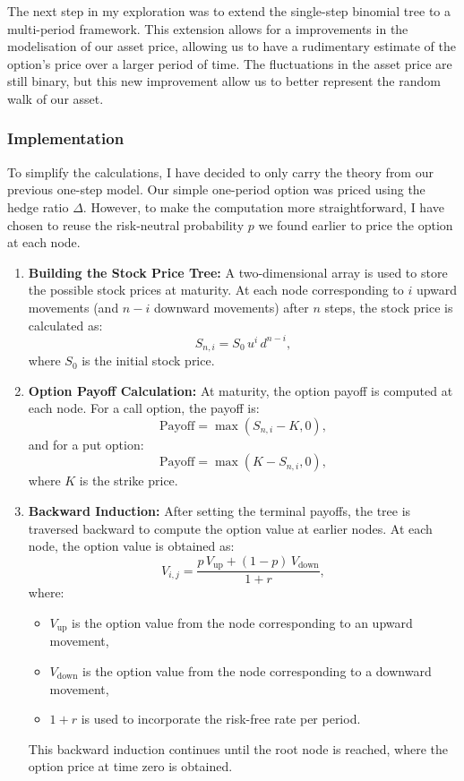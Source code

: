 \documentclass{article}
\begin{document}
    The next step in my exploration was to extend the single-step binomial tree to a multi-period framework.
    This extension allows for a improvements in the modelisation of our asset price, allowing us to have a rudimentary estimate of the option's price over a larger period of time.
    The fluctuations in the asset price are still binary, but this new improvement allow us to better represent the random walk of our asset.

    \subsubsection{Implementation}

    To simplify the calculations, I have decided to only carry the theory from our previous one-step model.
    Our simple one-period option was priced using the hedge ratio \(\Delta\).
    However, to make the computation more straightforward, I have chosen to reuse the risk-neutral probability \(p\) we found earlier to price the option at each node.

    \begin{enumerate}

        \item \textbf{Building the Stock Price Tree:} A two-dimensional array is used to store the possible stock prices at maturity. At each node corresponding to \( i \) upward movements (and \( n-i \) downward movements) after \( n \) steps, the stock price is calculated as:
        \[
        S_{n,i} = S_0 \, u^i \, d^{n-i},
        \]
        where \( S_0 \) is the initial stock price.

        \item \textbf{Option Payoff Calculation:} At maturity, the option payoff is computed at each node. For a call option, the payoff is:
        \[
        \text{Payoff} = \max(S_{n,i} - K, 0),
        \]
        and for a put option:
        \[
        \text{Payoff} = \max(K - S_{n,i}, 0),
        \]
        where \( K \) is the strike price.

        \item \textbf{Backward Induction:} After setting the terminal payoffs, the tree is traversed backward to compute the option value at earlier nodes. At each node, the option value is obtained as:
        \[
        V_{i,j} = \frac{p \, V_{\text{up}} + (1 - p) \, V_{\text{down}}}{1 + r},
        \]
        where:
        \begin{itemize}
            \item \( V_{\text{up}} \) is the option value from the node corresponding to an upward movement,
            \item \( V_{\text{down}} \) is the option value from the node corresponding to a downward movement,
            \item \( 1 + r \) is used to incorporate the risk-free rate per period.
        \end{itemize}
        This backward induction continues until the root node is reached, where the option price at time zero is obtained.
    \end{enumerate}
\end{document}
